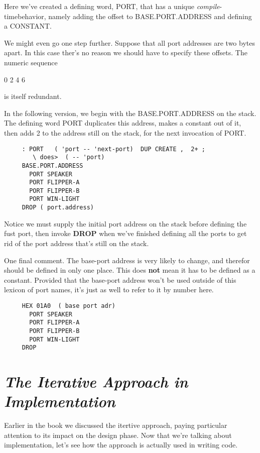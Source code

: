 \documentclass{book}
\begin{document}
\noindent
Here we've created a defining word, PORT, that has a unique \textit{compile}-timebehavior, namely adding the offset to BASE.PORT.ADDRESS and defining a CONSTANT.

We might even go one step further. Suppose that all port addresses are two bytes apart. In this case ther's no reason we should have to specify these offsets. The numeric sequence

\medskip

0 2 4 6

\medskip

\noindent
is itself redundant.

In the following version, we begin with the BASE.PORT.ADDRESS on the stack. The defining word PORT duplicates this address, makes a constant out of it, then adds 2 to the address still on the stack, for the next invocation of PORT.

\begin{verbatim}
     : PORT   ( 'port -- 'next-port)  DUP CREATE ,  2+ ;
        \ does>  ( -- 'port)
     BASE.PORT.ADDRESS
       PORT SPEAKER
       PORT FLIPPER-A
       PORT FLIPPER-B
       PORT WIN-LIGHT
     DROP ( port.address)
\end{verbatim}

\bigskip

\noindent
Notice we must supply the initial port address on the stack before defining the fust port, then invoke \textbf{DROP} when we've finished defining all the ports to get rid of the port address that's still on the stack.

One final comment. The base-port address is very likely to change, and therefor should be defined in only one place. This does \textbf{not} mean it has to be defined as a constant. Provided that the base-port address won't be used outside of this lexicon of port names, it's just as well to refer to it by number here.

\begin{verbatim}
     HEX 01A0  ( base port adr)
       PORT SPEAKER
       PORT FLIPPER-A
       PORT FLIPPER-B
       PORT WIN-LIGHT
     DROP
\end{verbatim}

\bigskip

\section*{
	\textbf{
		\textit{The Iterative Approach in Implementation}}}

\noindent
Earlier in the book we discussed the itertive approach, paying particular attention to its impact on the design phase. Now that we're talking about implementation, let's see how the approach is actually used in writing code.
\end{document}
